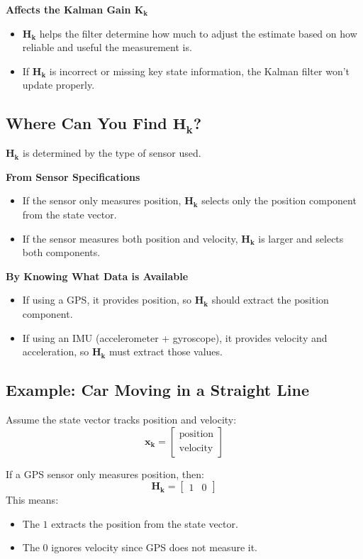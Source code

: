 \documentclass{article}
\begin{document}
\textbf{Affects the Kalman Gain \(\mathbf{K_k}\)}
\begin{itemize}
    \item \(\mathbf{H_k}\) helps the filter determine how much to adjust the estimate based on how reliable and useful the measurement is.
    \item If \(\mathbf{H_k}\) is incorrect or missing key state information, the Kalman filter won't update properly.
\end{itemize}

\subsection*{Where Can You Find \(\mathbf{H_k}\)?}
\(\mathbf{H_k}\) is determined by the type of sensor used.

\textbf{From Sensor Specifications}
\begin{itemize}
    \item If the sensor only measures position, \(\mathbf{H_k}\) selects only the position component from the state vector.
    \item If the sensor measures both position and velocity, \(\mathbf{H_k}\) is larger and selects both components.
\end{itemize}

\textbf{By Knowing What Data is Available}
\begin{itemize}
    \item If using a GPS, it provides position, so \(\mathbf{H_k}\) should extract the position component.
    \item If using an IMU (accelerometer + gyroscope), it provides velocity and acceleration, so \(\mathbf{H_k}\) must extract those values.
\end{itemize}

\subsection*{Example: Car Moving in a Straight Line}
Assume the state vector tracks position and velocity:
\[
\mathbf{x_k} =
\begin{bmatrix}
\text{position} \\
\text{velocity}
\end{bmatrix}
\]

If a GPS sensor only measures position, then:
\[
\mathbf{H_k} =
\begin{bmatrix}
1 & 0
\end{bmatrix}
\]
This means:
\begin{itemize}
    \item The \(1\) extracts the position from the state vector.
    \item The \(0\) ignores velocity since GPS does not measure it.
\end{itemize}
\end{document}
